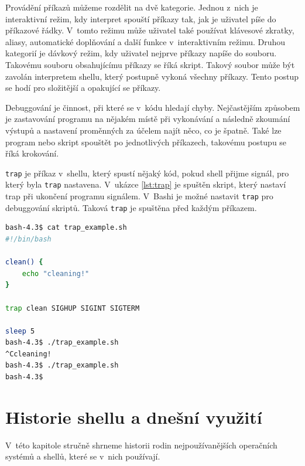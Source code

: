\documentclass[thesis=M,czech]{FITthesis}[2012/06/26]
\begin{document}
Provádění příkazů můžeme rozdělit na dvě kategorie. Jednou z~nich je interaktivní režim, kdy interpret spouští příkazy tak, jak je uživatel píše do příkazové řádky. V~tomto režimu může uživatel také používat klávesové zkratky, aliasy, automatické doplňování a další funkce v~interaktivním režimu. Druhou kategorií je dávkový režim, kdy uživatel nejprve příkazy napíše do souboru. Takovému souboru obsahujícímu příkazy se říká skript. Takový soubor může být zavolán interpretem shellu, který postupně vykoná všechny příkazy. Tento postup se hodí pro složitější a opakující se příkazy.


Debuggování je činnost, při které se v~kódu hledají chyby. Nejčastějším způsobem je zastavování programu na nějakém místě při vykonávání a následně zkoumání výstupů a nastavení proměnných za účelem najít něco, co je špatně. Také lze program nebo skript spouštět po jednotlivých příkazech, takovému postupu se říká krokování.


\texttt{trap} je příkaz v~shellu, který spustí nějaký kód, pokud shell přijme signál, pro který byla \texttt{trap} nastavena. V~ukázce \ref{lst:trap} je spuštěn skript, který nastaví trap při ukončení programu signálem. V~Bashi je možné nastavit \texttt{trap} pro debuggování skriptů. Taková \texttt{trap} je spuštěna před každým příkazem.

\noindent
\begin{minipage}{\linewidth}
\begin{lstlisting}[language=bash, caption={Ukázka trap v~shellu Bash}, label={lst:trap}]
bash-4.3$ cat trap_example.sh
#!/bin/bash

clean() {
	echo "cleaning!"
}

trap clean SIGHUP SIGINT SIGTERM

sleep 5
bash-4.3$ ./trap_example.sh
^Ccleaning!
bash-4.3$ ./trap_example.sh
bash-4.3$
\end{lstlisting}
\end{minipage}

%
\chapter{Historie shellu a dnešní využití}

V~této kapitole stručně shrneme historii rodin nejpoužívanějších operačních systémů a shellů, které se v~nich používají.

\end{document}
